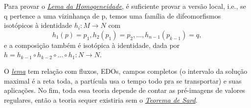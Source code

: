 \documentclass[../differential_topology.tex]{subfiles}
\begin{document}
Para provar o \hyperlink{homogeneity_lemma}{\textit{Lema da Homogeneidade}}, é suficiente provar a versão local, i.e., se q pertence a uma vizinhança de p, temos uma família de difeomorfismos isotópicos à identidade \(h_{i}:M\rightarrow N\) com
\[
	h_1(p) = p_1, h_2(p_1)=p_2, \dotsc , h_{n-1}(p_{k-1}) = q,
\]
e a composição também é isotópica à identidade, dada por \(h=h_{k-1}\circ h_{k-2}\circ \dotsc \circ h_1:N\rightarrow N\).

O \hyperlink{homogeneity_lemma}{\textit{lema}} tem relação com fluxos, EDOs, campos completos (o intervalo da solução maximal é a reta toda, a partícula usa o tempo todo pra se transportar) e suas aplicações.
No fim, toda essa teoria depende de contar as pré-imagens de valores regulares, então a teoria sequer existiria sem o \hyperlink{sard_theorem}{\textit{Teorema de Sard}}.
\end{document}
